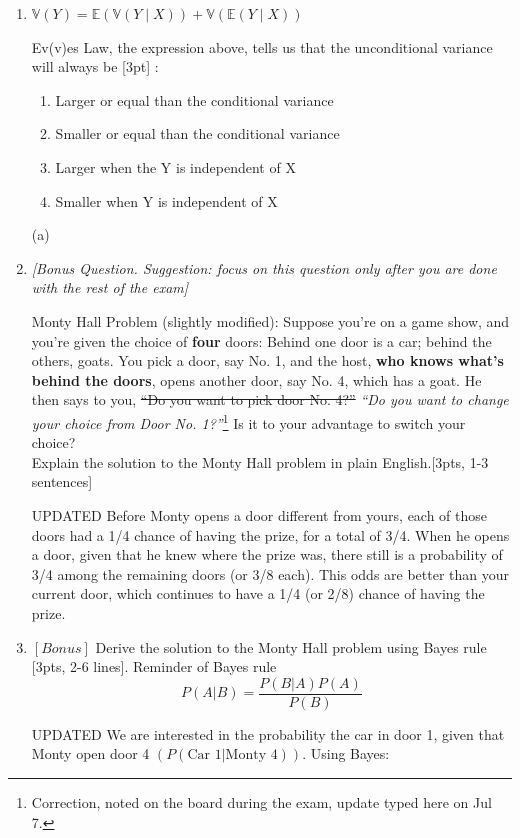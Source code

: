 \documentclass[answers]{exam}
\begin{document}
\begin{enumerate}
\item $\mathbb{V}(Y)=\mathbb{E}(\mathbb{V}(Y \mid X))+\mathbb{V}(\mathbb{E}(Y \mid X))$

Ev(v)es Law, the expression above, tells us that the unconditional variance will always be [3pt] : 
\begin{enumerate}
    \item Larger or equal than the conditional variance
    \item Smaller or equal than the conditional variance
    \item Larger when the Y is independent of X
    \item Smaller when Y is independent of X
\end{enumerate}
\begin{solution}
(a)
\end{solution}
\vspace{3cm}
\newpage

\item \textit{[Bonus Question. Suggestion: focus on this question only after you are done with the rest of the exam]}

Monty Hall Problem (slightly modified):
Suppose you're on a game show, and you're given the choice of \textbf{four} doors: Behind one door is a car; behind the others, goats. You pick a door, say No. 1, and the host, \textbf{who knows what's behind the doors}, opens another door, say No. 4, which has a goat. He then says to you, \st{``Do you want to pick door No. 4?''} \textit{``Do you want to change your choice from Door No. 1?''}\footnote{Correction, noted on the board during the exam, update typed here on Jul 7.} Is it to your advantage to switch your choice?\\

Explain the solution to the Monty Hall problem in plain English.[3pts, 1-3 sentences]
\begin{solution}
UPDATED Before Monty opens a door different from yours, each of those doors had a 1/4 chance of having the prize, for a total of 3/4. When he opens a door, given that he knew where the prize was, there still is a probability of 3/4 among the remaining doors (or 3/8 each). This odds are better than your current door, which continues to have a 1/4 (or 2/8) chance of having the prize. 
\end{solution}

\item $[Bonus]$ Derive the solution to the Monty Hall problem using Bayes rule [3pts, 2-6 lines]. 
Reminder of Bayes rule 
\begin{equation}
    P(A|B) = \frac{P(B|A)P(A)}{P(B)}
\end{equation}
\begin{solution}
UPDATED We are interested in the probability the car in door 1, given that Monty open door 4 $(P(\text{Car 1}| \text{Monty 4}))$. Using Bayes: 


\end{solution}
\end{enumerate}
\end{document}
